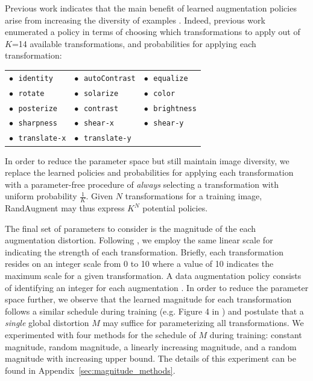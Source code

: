 Previous work indicates that the main benefit of learned augmentation policies arise from increasing the diversity of examples \cite{cubuk2018autoaugment,ho2019population,lim2019fast}. 
Indeed, previous work enumerated a policy in terms of choosing which transformations to apply out of $K$=14 available transformations, and probabilities for applying each transformation:
\begin{table}[H]
\footnotesize
\centering
\def\arraystretch{1.0}
\begin{tabular}{lll}
$\bullet\;$ \texttt{identity} & $\bullet\;$ \texttt{autoContrast} &
$\bullet\;$ \texttt{equalize} \\ $\bullet\;$ \texttt{rotate} &
$\bullet\;$ \texttt{solarize} & $\bullet\;$ \texttt{color} \\
$\bullet\;$ \texttt{posterize} &
$\bullet\;$ \texttt{contrast} & $\bullet\;$ \texttt{brightness} \\
$\bullet\;$ \texttt{sharpness} & $\bullet\;$ \texttt{shear-x} &
$\bullet\;$ \texttt{shear-y} \\
$\bullet\;$ \texttt{translate-x} &
$\bullet\;$ \texttt{translate-y} \\
\end{tabular}
\end{table}
\vspace{-0.4cm}
\noindent
In order to reduce the parameter space but still maintain image diversity, we replace the learned policies and probabilities for applying each transformation with a parameter-free procedure of {\em always} selecting a transformation with uniform probability $\frac{1}{K}$.
Given $N$ transformations for a training image, RandAugment may thus express $K^{N}$ potential policies.



The final set of parameters to consider is the magnitude of the each augmentation distortion.
Following \cite{cubuk2018autoaugment}, we employ the same linear scale for indicating the strength of each transformation. Briefly, each transformation resides on an integer scale from 0 to 10 where a value of 10 indicates the maximum scale for a given transformation. A data augmentation policy consists of identifying an integer for each augmentation \cite{cubuk2018autoaugment, lim2019fast, ho2019population}.
In order to reduce the parameter space further, we observe that the learned magnitude for each transformation follows a similar schedule during training (e.g. Figure 4 in \cite{ho2019population}) and postulate that a {\em single} global distortion $M$ may suffice for parameterizing all transformations. We experimented with four methods for the schedule of $M$ during training: constant magnitude, random magnitude, a linearly increasing magnitude, and a random magnitude with increasing upper bound. The details of this experiment can be found in Appendix~\ref{sec:magnitude_methods}. 

